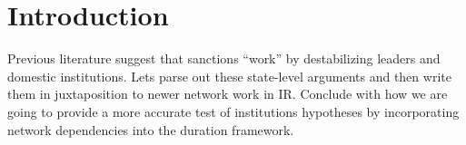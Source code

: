 \section{Introduction}
\label{intro}

Previous literature suggest that sanctions ``work'' by destabilizing leaders and domestic institutions. Lets parse out these state-level arguments and then write them in juxtaposition to newer network work in IR. 
Conclude with how we are going to provide a more accurate test of institutions hypotheses by incorporating network dependencies into the duration framework. 